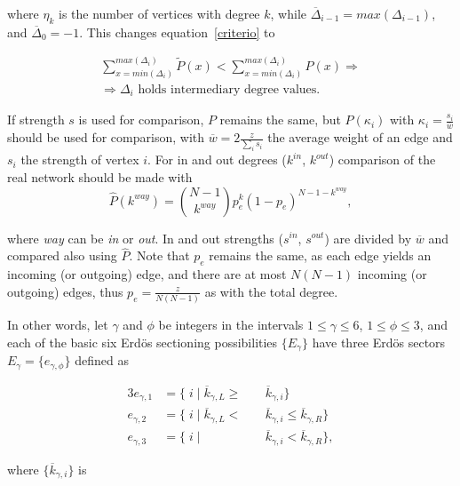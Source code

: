 \documentclass[%
	aip,
	jmp,%
	amsmath,amssymb,
	reprint,%
]{revtex4-1}
\begin{document}
\noindent where $\eta_k$ is the number of vertices with degree $k$, while $\overline{\Delta}_{i-1}=max(\Delta_{i-1})$, and $\overline{\Delta}_{0}=-1$. This changes equation~\ref{criterio} to

\begin{equation}\label{criterio2}
	\begin{split}
	\sum_{x=min(\Delta_i)}^{max(\Delta_i)} \widetilde{P}(x) < \sum_{x=min(\Delta_i)}^{max(\Delta_i)} P(x) \Rightarrow \\
	\Rightarrow \Delta_i \text{ holds intermediary degree values.}
	\end{split}
\end{equation}

If strength $s$ is used for comparison, $P$ remains the same, but $P(\kappa_i)$ with $\kappa_i=\frac{s_i}{\overline{w}}$ should be used for comparison, with $\overline{w}=2\frac{z}{\sum_is_i}$ the average weight of an edge and $s_i$ the strength of vertex $i$. For in and out degrees ($k^{in}$, $k^{out}$) comparison of the real network should be made with
\begin{equation}
	\hat{P}(k^{way})=\binom{N-1}{k^{way}}p_e^k(1-p_e)^{N-1-k^{way}},
\end{equation}

\noindent where \emph{way} can be \emph{in} or \emph{out}. In and out strengths ($s^{in}$, $s^{out}$) are divided by $\overline{w}$ and compared also using $\hat{P}$. Note that $p_e$ remains the same, as each edge yields an incoming (or outgoing) edge, and there are at most $N(N-1)$ incoming (or outgoing) edges, thus $p_e=\frac{z}{N(N-1)}$ as with the total degree.

In other words, let $\gamma$ and $\phi$ be integers in the intervals $1 \leq \gamma \leq 6$, $1 \leq \phi \leq 3$, and each of the basic six Erd\"os sectioning possibilities $\{E_{\gamma}\}$ have three Erd\"os sectors $E_{\gamma}= \{e_{\gamma, \phi} \}$ defined as

\begin{alignat}{3}\label{eq:part}
	e_{\gamma,1}&=\{\;i\;|\;\overline{k}_{\gamma,L}\geq&&\overline{k}_{\gamma,i}\} \nonumber \\
	e_{\gamma,2}&=\{\;i\;|\;\overline{k}_{\gamma,L}<\;&&\overline{k}_{\gamma,i}\leq\overline{k}_{\gamma,R}\} \\ 
	e_{\gamma,3}&=\{\;i\;|\;&&\overline{k}_{\gamma,i}<\overline{k}_{\gamma,R}\} \nonumber,
\end{alignat}

\noindent where $\{\overline{k}_{\gamma,i}\}$ is
\end{document}
